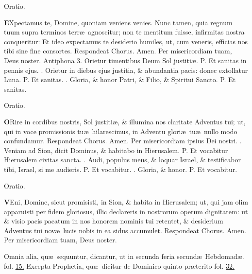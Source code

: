 \documentclass[letter,11pt]{book}
\makeatletter
\DeclareRobustCommand{\Vbar}{\vers@resp{-0.1em}{V}}
\DeclareRobustCommand{\Rbar}{\vers@resp{0pt}{R}}
\newcommand{\vers@resp@sym}{\raisebox{0.2ex}{\rotatebox[origin=c]{-20}{$\m@th\rceil$}}}
\newcommand{\vers@resp}[2]{%
  {\ooalign{\hidewidth\kern#1\vers@resp@sym\hidewidth\cr#2\cr}}%
}%
\def\P{\color{Red} P. \color{black}}
\def\V{\color{Red} \Vbar . \color{black}}
\def\R{\color{Red} \Rbar . \color{black}}
\makeatother
\begin{document}
\begin{multicols}{2}
\vspace{-.5em} \begin{center} \color{Red} Oratio. \color{black} \end{center} \vspace{-.5em}
\lettrine[lines=2]{\bfseries \color{Red} E}{}Xpectamus te, Domine, quoniam veniens venies. Nunc tamen, quia regnum tuum supra terminos terr\ae \ agnoscitur; non te mentitum fuisse, infirmitas nostra conqueritur: Et ideo expectamus te desiderio humiles, ut, cum veneris, efficias nos tibi sine fine consortes. \color{Red} Respondeat Chorus. \color{black} Amen. Per misericordiam tuam, Deus noster.
\newline \color{Red} Antiphona 3. \color{black} Orietur timentibus Deum Sol justiti\ae . \P Et sanitas in pennis ejus. \V Orietur in diebus ejus justitia, \& abundantia pacis: donec extollatur Luna. \P Et sanitas. \V Gloria, \& honor Patri, \& Filio, \& Spiritui Sancto. \P Et sanitas.
\vspace{-.5em} \begin{center} \color{Red} Oratio. \color{black} \end{center} \vspace{-.5em}
\lettrine[lines=2]{\bfseries \color{Red} O}{}Rire in cordibus nostris, Sol justiti\ae , \& illumina nos claritate Adventus tui; ut, qui in voce promissionis tu\ae \ hilarescimus, in Adventu glori\ae \ tu\ae \ nullo modo confundamur. \color{Red} Respondeat Chorus. \color{black} Amen. Per misericordiam ipsius Dei nostri.
\newline \R Veniam ad Sion, dicit Dominus, \& habitabo in Hierusalem. \P Et vocabitur Hierusalem civitas sancta. \V Audi, populus meus, \& loquar Israel, \& testificabor tibi, Israel, si me audieris. \P Et vocabitur. \V Gloria, \& honor. \P Et vocabitur.
\vspace{-.5em} \begin{center} \color{Red} Oratio. \color{black} \end{center} \vspace{-.5em}
\lettrine[lines=2]{\bfseries \color{Red} V}{}Eni, Domine, sicut promisisti, in Sion, \& habita in Hierusalem; ut, qui jam
olim apparuisti per fidem gloriosus, illic declareris in nostrorum operum dignitatem: ut \& visio pacis pacatum in nos honorem nominis tui retentet, \& desiderium Adventus tui nov\ae \ lucis nobis in ea sidus accumulet. \color{Red} Respondeat Chorus. \color{black} Amen. Per misericordiam tuam, Deus noster.
\par \color{Red} Omnia alia, qu\ae \ sequuntur, dicantur, ut in secunda feria secund\ae \ Hebdomad\ae . fol. \color{black} \hyperlink{MON-SECUNDA-ADV-MAT}{15.} \color{Red} Excepta Prophetia, qu\ae \ dicitur de Dominico quinto pr\ae terito fol. \color{black} \hyperlink{micheas.4}{32.}

\end{multicols}
\end{document}

